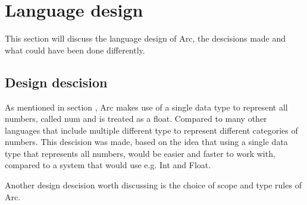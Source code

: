 \section{Language design}

This section will discuss the language design of Arc, the descisions made and what could have been done differently.

\subsection{Design descision} 

As mentioned in section , Arc makes use of a single data type to represent all numbers, called num and is treated as a float. Compared to many other languages that include multiple different type to represent different categories of numbers. This descision was made, based on the idea that using a single data type that represents all numbers, would be easier and faster to work with, compared to a system that would use e.g. Int and Float. 

Another design descision worth discussing is the choice of scope and type rules of Arc. 

